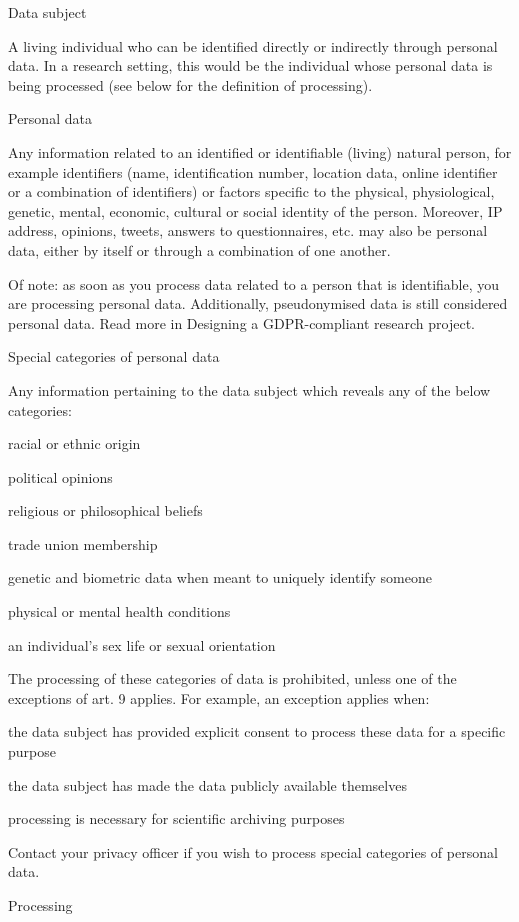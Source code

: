 \documentclass[
]{book}
\begin{document}
Data subject

A living individual who can be identified directly or indirectly through personal data.
In a research setting, this would be the individual whose personal data is being processed
(see below for the definition of processing).

Personal data

Any information related to an identified or identifiable (living) natural person, for example
identifiers (name, identification number, location data, online identifier or a combination of
identifiers) or factors specific to the physical, physiological, genetic, mental, economic,
cultural or social identity of the person. Moreover, IP address, opinions, tweets, answers
to questionnaires, etc. may also be personal data, either by itself or through a combination of one another.

Of note: as soon as you process data related to a person that is identifiable, you are
processing personal data. Additionally, pseudonymised data is still considered personal data.
Read more in Designing a GDPR-compliant research project.

Special categories of personal data

Any information pertaining to the data subject which reveals any of the below categories:

racial or ethnic origin

political opinions

religious or philosophical beliefs

trade union membership

genetic and biometric data when meant to uniquely identify someone

physical or mental health conditions

an individual's sex life or sexual orientation

The processing of these categories of data is prohibited, unless one of the
exceptions of art. 9 applies.
For example, an exception applies when:

the data subject has provided explicit consent to process these data for a specific purpose

the data subject has made the data publicly available themselves

processing is necessary for scientific archiving purposes

Contact your privacy officer
if you wish to process special categories of personal data.

Processing
\end{document}
